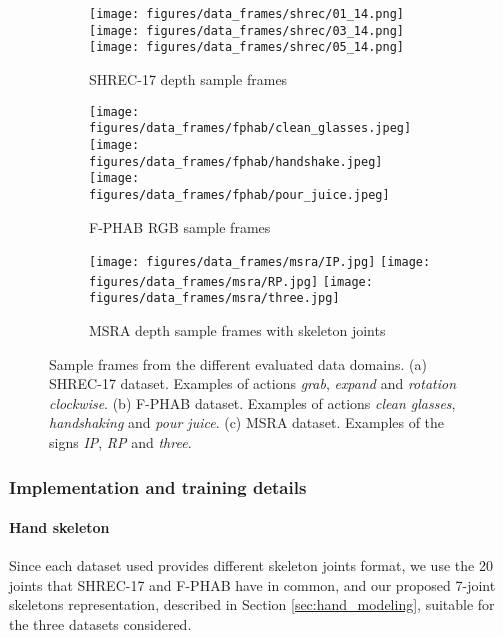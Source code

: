 \documentclass[letterpaper, 10 pt, conference]{ieeeconf}
\begin{document}
\begin{figure}[!bt]
\centering
\begin{subfigure}[b]{\linewidth} 
    \texttt{[image: figures/data\_frames/shrec/01\_14.png]}
    \texttt{[image: figures/data\_frames/shrec/03\_14.png]}
    \texttt{[image: figures/data\_frames/shrec/05\_14.png]}
    \caption{SHREC-17 depth sample frames}
\end{subfigure}
\begin{subfigure}[b]{\linewidth} 
    \texttt{[image: figures/data\_frames/fphab/clean\_glasses.jpeg]}
    \texttt{[image: figures/data\_frames/fphab/handshake.jpeg]}
    \texttt{[image: figures/data\_frames/fphab/pour\_juice.jpeg]}
    \caption{F-PHAB RGB sample frames}
\end{subfigure}
\begin{subfigure}[b]{\linewidth} 
    \texttt{[image: figures/data\_frames/msra/IP.jpg]}
    \texttt{[image: figures/data\_frames/msra/RP.jpg]}
    \texttt{[image: figures/data\_frames/msra/three.jpg]}
    \caption{MSRA depth sample frames with skeleton joints}
\end{subfigure}
    \caption{Sample frames from the different evaluated data domains. (a) SHREC-17 dataset. Examples of actions \textit{grab}, \textit{expand} and \textit{rotation clockwise}. (b) F-PHAB dataset. Examples of actions \textit{clean glasses}, \textit{handshaking} and \textit{pour juice}. (c) MSRA dataset. Examples of the signs \textit{IP}, \textit{RP} and \textit{three}.}
    \label{fig:frame_samples}
\end{figure}






\subsubsection{Implementation and training details}
\paragraph*{Hand skeleton}
Since each dataset used provides different skeleton joints format, we use the 20 joints that SHREC-17 and F-PHAB have in common, and our proposed 7-joint skeletons representation, described in Section \ref{sec:hand_modeling}, suitable for the three datasets considered.
\end{document}
